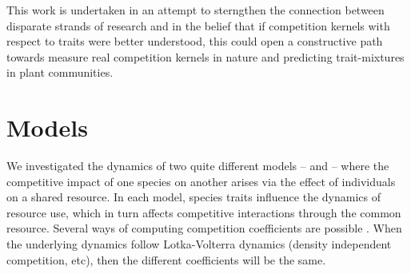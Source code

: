 \documentclass[a4paper,11pt]{article}
\begin{document}
This work is undertaken in an attempt to sterngthen the connection between disparate
strands of research and in the belief that if competition kernels with respect
to traits were better understood, this could open a constructive path towards
measure real competition kernels in nature and predicting trait-mixtures in plant
communities.

\section{Models}



We investigated the dynamics of two quite different models -- \plant
and \Rstar -- where the competitive impact of one species on another
arises via the effect of individuals on a shared resource. In each
model, species traits influence the dynamics of resource use, which in
turn affects competitive interactions through the common resource.
Several ways of computing competition coefficients are possible
\citep[e.g.,][]{Abrams-1987,Abrams-2008}.  When the underlying
dynamics follow Lotka-Volterra dynamics (density independent
competition, etc), then the different coefficients will be the same.
\end{document}
